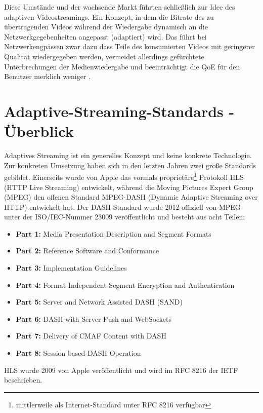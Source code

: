 \documentclass[paper = a4, fontsize = 12pt, parskip = half]{scrartcl} %
\begin{document}
Diese Umstände und der wachsende Markt führten schließlich zur Idee des adaptiven Videostreamings. Ein Konzept, in dem die Bitrate des zu übertragenden Videos während der Wiedergabe dynamisch an die Netzwerkgegebenheiten angepasst (adaptiert) wird. Das führt bei Netzwerkengpässen zwar dazu dass Teile des konsumierten Videos mit geringerer Qualität wiedergegeben werden, vermeidet allerdings gefürchtete Unterbrechungen der Medienwiedergabe und beeinträchtigt die QoE für den Benutzer merklich weniger \cite{seufert_survey_2015}.

\section{Adaptive-Streaming-Standards - Überblick}
Adaptives Streaming ist ein generelles Konzept und keine konkrete Technologie. Zur konkreten Umsetzung haben sich in den letzten Jahren zwei große Standards gebildet. Einerseits wurde von Apple das vormals proprietäre\footnote{mittlerweile als Internet-Standard unter RFC 8216 \cite{pantos_http_nodate} verfügbar} Protokoll HLS (HTTP Live Streaming) entwickelt, während die Moving Pictures Expert Group (MPEG) den offenen Standard MPEG-DASH (Dynamic Adaptive Streaming over HTTP) entwickelt hat. Der DASH-Standard wurde 2012 offiziell von MPEG unter der ISO/IEC-Nummer 23009 \cite{international_organization_for_standardization_isoiec_nodate} veröffentlicht und besteht aus acht Teilen:

\begin{itemize}
	\item \textbf{Part 1:} Media Presentation Description and Segment Formats
	\item \textbf{Part 2:} Reference Software and Conformance
	\item \textbf{Part 3:} Implementation Guidelines
	\item \textbf{Part 4:} Format Independent Segment Encryption and Authentication
	\item \textbf{Part 5:} Server and Network Assisted DASH (SAND)
	\item \textbf{Part 6:} DASH with Server Push and WebSockets
	\item \textbf{Part 7:} Delivery of CMAF Content with DASH
	\item \textbf{Part 8:} Session based DASH Operation
\end{itemize}

HLS wurde 2009 von Apple veröffentlicht und wird im RFC 8216 \cite{pantos_http_nodate} der IETF beschrieben.
\end{document}
